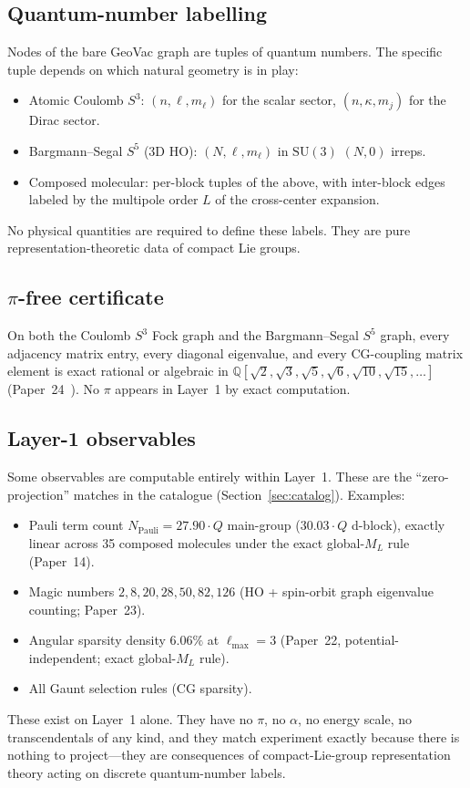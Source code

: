 \documentclass[11pt]{article}
\begin{document}

\subsection{Quantum-number labelling}
\label{sec:layer1_labels}
Nodes of the bare GeoVac graph are tuples of quantum numbers.  The
specific tuple depends on which natural geometry is in play:
\begin{itemize}
\setlength\itemsep{0pt}
\item Atomic Coulomb $S^3$: $(n, \ell, m_\ell)$ for the scalar sector,
$(n, \kappa, m_j)$ for the Dirac sector.
\item Bargmann--Segal $S^5$ (3D HO): $(N, \ell, m_\ell)$ in $\mathrm{SU}(3)$
$(N, 0)$ irreps.
\item Composed molecular: per-block tuples of the above, with
inter-block edges labeled by the multipole order $L$ of the
cross-center expansion.
\end{itemize}
No physical quantities are required to define these labels.  They
are pure representation-theoretic data of compact Lie groups.

\subsection{$\pi$-free certificate}
\label{sec:layer1_pi_free}
On both the Coulomb $S^3$ Fock graph and the Bargmann--Segal $S^5$
graph, every adjacency matrix entry, every diagonal eigenvalue, and
every CG-coupling matrix element is exact rational or algebraic in
$\mathbb{Q}[\sqrt{2}, \sqrt{3}, \sqrt{5}, \sqrt{6}, \sqrt{10},
\sqrt{15}, \ldots]$ (Paper~24~\cite{paper24}).  No $\pi$ appears in Layer~1 by
exact computation.

\subsection{Layer-1 observables}
\label{sec:layer1_obs}
Some observables are computable entirely within Layer~1.  These are
the ``zero-projection'' matches in the catalogue
(Section~\ref{sec:catalog}).  Examples:
\begin{itemize}
\setlength\itemsep{0pt}
\item Pauli term count $N_\text{Pauli} = 27.90 \cdot Q$ main-group
($30.03 \cdot Q$ d-block), exactly linear across 35 composed molecules
under the exact global-$M_L$ rule (Paper~14).
\item Magic numbers $2, 8, 20, 28, 50, 82, 126$ (HO + spin-orbit
graph eigenvalue counting; Paper~23).
\item Angular sparsity density $6.06\%$ at $\ell_\text{max}=3$
(Paper~22, potential-independent; exact global-$M_L$ rule).
\item All Gaunt selection rules (CG sparsity).
\end{itemize}
These exist on Layer~1 alone.  They have no $\pi$, no $\alpha$, no
energy scale, no transcendentals of any kind, and they match
experiment exactly because there is nothing to project---they are
consequences of compact-Lie-group representation theory acting on
discrete quantum-number labels.
\end{document}
